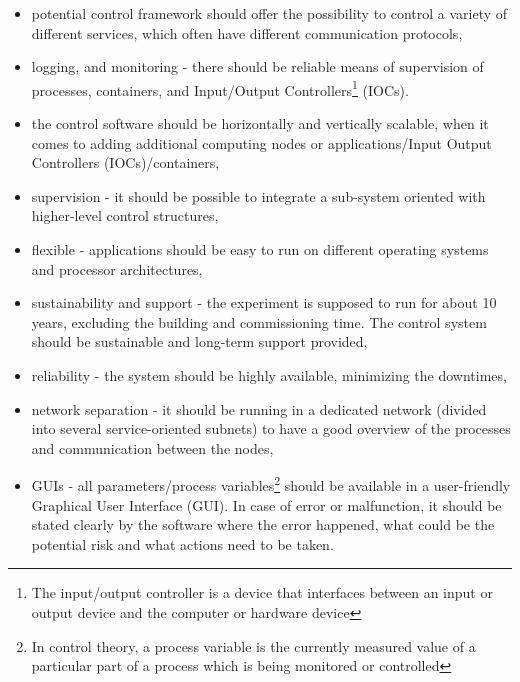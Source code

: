  
 \begin{itemize}
    \item potential control framework should offer the possibility to control a variety of different services, which often have different communication protocols,
    \item logging, and monitoring - there should be reliable means of supervision of processes, containers, and Input/Output Controllers\footnote{The input/output controller is a device that interfaces between an input or output device and the computer or hardware device} (\glspl{IOC}).
    \item the control software should be horizontally and vertically scalable, when it comes to adding additional computing nodes or applications/Input Output Controllers (\glspl{IOC})/containers,
    \item supervision - it should be possible to integrate a sub-system oriented with higher-level control structures,
     \item flexible - applications should be easy to run on different operating systems and processor architectures,
     \item sustainability and support - the experiment is supposed to run for about 10 years, excluding the building and commissioning time. The control system should be sustainable and long-term support provided,
     \item reliability - the system should be highly available, minimizing the downtimes,
     \item network separation - it should be running in a dedicated network (divided into several service-oriented subnets) to have a good overview of the processes and communication between the nodes,
     \item \glspl{GUI} - all parameters/process variables\footnote{In control theory, a process variable is the currently measured value of a particular part of a process which is being monitored or controlled} should be available in a user-friendly Graphical User Interface (\gls{GUI}). In case of error or malfunction, it should be stated clearly by the software where the error happened, what could be the potential risk and what actions need to be taken.

 \end{itemize}
\newpage

